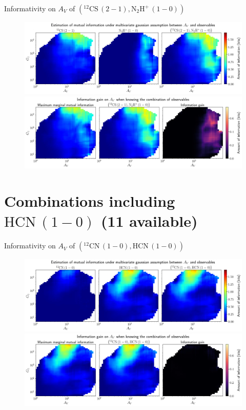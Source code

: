 \documentclass{beamer}
\begin{document}
\begin{frame}{Informativity on $A_V$ of $\left(\mathrm{^{12}CS\,(2-1)},\mathrm{N_2H^+\,(1-0)}\right)$}
    \begin{figure}
        \centering
        \includegraphics[width=0.95\linewidth]{../linearinfogauss/av__12cs21_n2hp10_linearinfogauss.png}
        \vfill
        \includegraphics[width=0.95\linewidth]{../linearinfogauss/av__12cs21_n2hp10_linearinfogauss_gain.png}
    \end{figure}
\end{frame}

\section{Combinations including $\mathrm{HCN\,(1-0)}$ (11 available)}

\begin{frame}{Informativity on $A_V$ of $\left(\mathrm{^{12}CN\,(1-0)},\mathrm{HCN\,(1-0)}\right)$}
    \begin{figure}
        \centering
        \includegraphics[width=0.95\linewidth]{../linearinfogauss/av__12cn10_hcn10_linearinfogauss.png}
        \vfill
        \includegraphics[width=0.95\linewidth]{../linearinfogauss/av__12cn10_hcn10_linearinfogauss_gain.png}
    \end{figure}
\end{frame}
\end{document}
